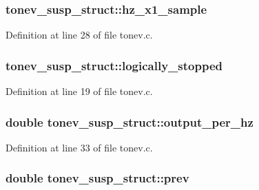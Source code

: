 \subsubsection[{\texorpdfstring{hz\+\_\+x1\+\_\+sample}{hz_x1_sample}}]{ tonev\+\_\+susp\+\_\+struct\+::hz\+\_\+x1\+\_\+sample}\hypertarget{structtonev__susp__struct_a732ee25c4bd6319c7697e23f50820dbb}{}\label{structtonev__susp__struct_a732ee25c4bd6319c7697e23f50820dbb}


Definition at line 28 of file tonev.\+c.

\subsubsection[{\texorpdfstring{logically\+\_\+stopped}{logically_stopped}}]{ tonev\+\_\+susp\+\_\+struct\+::logically\+\_\+stopped}\hypertarget{structtonev__susp__struct_a4b40a878a06bb09d9d44166f46cc825f}{}\label{structtonev__susp__struct_a4b40a878a06bb09d9d44166f46cc825f}


Definition at line 19 of file tonev.\+c.

\subsubsection[{\texorpdfstring{output\+\_\+per\+\_\+hz}{output_per_hz}}]{\setlength{\rightskip}{0pt plus 5cm}double tonev\+\_\+susp\+\_\+struct\+::output\+\_\+per\+\_\+hz}\hypertarget{structtonev__susp__struct_af381b352d0ef2bb1b44ce047a5fc7c42}{}\label{structtonev__susp__struct_af381b352d0ef2bb1b44ce047a5fc7c42}


Definition at line 33 of file tonev.\+c.

\subsubsection[{\texorpdfstring{prev}{prev}}]{\setlength{\rightskip}{0pt plus 5cm}double tonev\+\_\+susp\+\_\+struct\+::prev}\hypertarget{structtonev__susp__struct_adf37cf6ef77d0db354a7be097f336e5a}{}\label{structtonev__susp__struct_adf37cf6ef77d0db354a7be097f336e5a}


